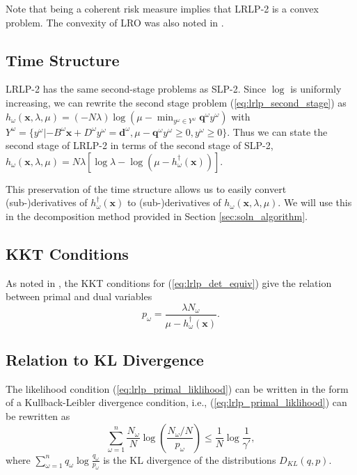 \documentclass[11pt]{article}
\newcommand{\x}{\mathbf{x}}
\newcommand{\q}{\mathbf{q}}
\renewcommand{\d}{\mathbf{d}}
\begin{document}
Note that being a coherent risk measure implies that LRLP-2 is a convex problem.
The convexity of LRO was also noted in \cite{wang2010likelihood}.

\subsection{Time Structure}
LRLP-2 has the same second-stage problems as SLP-2.
Since $\log$ is uniformly increasing, we can rewrite the second stage problem (\ref{eq:lrlp_second_stage}) as $h_\omega(\x,\lambda,\mu) = (-N\lambda) \log(\mu - \min_{y^\omega \in Y^\omega} \q^\omega y^\omega )$ with $Y^\omega = \{y^\omega | -B^\omega \x + D^\omega y^\omega = \d^\omega, \mu - \q^\omega y^\omega \geq 0, y^\omega \geq 0\}$.
Thus we can state the second stage of LRLP-2 in terms of the second stage of SLP-2, $h_\omega(\x,\lambda,\mu) = N\lambda\left[\log\lambda - \log(\mu - h^\dagger_\omega(\x))\right]$.

This preservation of the time structure allows us to easily convert (sub-)derivatives of $h^\dagger_\omega(\x)$ to (sub-)derivatives of $h_\omega(\x,\lambda,\mu)$.
We will use this in the decomposition method provided in Section \ref{sec:soln_algorithm}.

\subsection{KKT Conditions}
As noted in \cite{wang2010likelihood}, the KKT conditions for (\ref{eq:lrlp_det_equiv}) give the relation between primal and dual variables
\begin{equation}
	p_\omega = \frac{\lambda N_\omega}{\mu - h^\dagger_\omega(\x)}. \label{eq:kkt}
\end{equation}

\subsection{Relation to KL Divergence}
The likelihood condition (\ref{eq:lrlp_primal_liklihood}) can be written in the form of a Kullback-Leibler divergence condition, i.e., (\ref{eq:lrlp_primal_liklihood}) can be rewritten as
\[
	\sum_{\omega=1}^n \frac{N_\omega}{N} \log\left( \frac{N_\omega/N}{p_\omega} \right) \leq \frac{1}{N} \log \frac{1}{\gamma'},
\]
where $\sum_{\omega=1}^n q_\omega \log \frac{q_\omega}{p_\omega}$ is the KL divergence of the distributions $D_{KL}(q,p)$.

\end{document}
